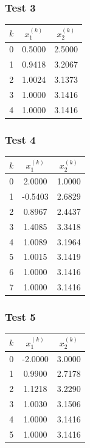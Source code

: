 \documentclass[a4paper,12pt]{article}
\begin{document}
	\subsubsection*{Test 3}
	\begin{center}
		\begin{tabular}{ccc}
			\toprule
			$k$ & $x_1^{(k)}$ & $x_2^{(k)}$ \\
			\midrule
			0 & 0.5000 & 2.5000 \\
			1 & 0.9418 & 3.2067 \\
			2 & 1.0024 & 3.1373 \\
			3 & 1.0000 & 3.1416 \\
			4 & 1.0000 & 3.1416 \\
			\bottomrule
		\end{tabular}
	\end{center}
	
	\subsubsection*{Test 4}
	\begin{center}
		\begin{tabular}{ccc}
			\toprule
			$k$ & $x_1^{(k)}$ & $x_2^{(k)}$ \\
			\midrule
			0 & 2.0000 & 1.0000 \\
			1 & -0.5403 & 2.6829 \\
			2 & 0.8967 & 2.4437 \\
			3 & 1.4085 & 3.3418 \\
			4 & 1.0089 & 3.1964 \\
			5 & 1.0015 & 3.1419 \\
			6 & 1.0000 & 3.1416 \\
			7 & 1.0000 & 3.1416 \\
			\bottomrule
		\end{tabular}
	\end{center}
	
	\subsubsection*{Test 5}
	\begin{center}
		\begin{tabular}{ccc}
			\toprule
			$k$ & $x_1^{(k)}$ & $x_2^{(k)}$ \\
			\midrule
			0 & -2.0000 & 3.0000 \\
			1 & 0.9900 & 2.7178 \\
			2 & 1.1218 & 3.2290 \\
			3 & 1.0030 & 3.1506 \\
			4 & 1.0000 & 3.1416 \\
			5 & 1.0000 & 3.1416 \\
			\bottomrule
		\end{tabular}
	\end{center}
	
\end{document}
